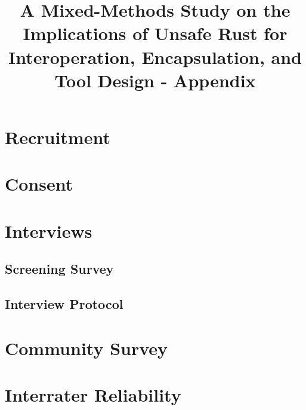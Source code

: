 \documentclass{article}
\title{A Mixed-Methods Study on the Implications of Unsafe Rust for Interoperation, Encapsulation, and Tool Design - Appendix}
\date{}
\author{}
\begin{document}
\maketitle
\tableofcontents
\newpage
\section{Recruitment}
\label{appendix:recruitment}

\newpage
\section{Consent}
\label{appendix:consent}

\newpage
\section{Interviews}
\subsection{Screening Survey}
\label{appendix:screening}

\newpage
\subsection{Interview Protocol}
\label{appendix:protocol}

\newpage
\section{Community Survey}
\label{appendix:community_survey}

\newpage
\section{Interrater Reliability}
\label{appendix:interrater_reliability}

\end{document}
